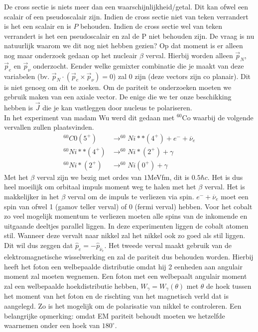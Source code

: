 \documentclass[../main.tex]{subfiles}
\begin{document}
De cross sectie is niets meer dan een waarschijnlijkheid/getal. Dit kan ofwel een scalair of een pseudoscalair zijn. Indien de cross sectie niet van teken verrandert is het een scalair en is $P$ behouden. Indien de cross sectie wel van teken verrandert is het een pseudoscalair en zal de P niet behouden zijn. De vraag is nu natuurlijk waarom we dit nog niet hebben gezien? Op dat moment is er alleen nog maar onderzoek gedaan op het nucleair $\beta$ verval. Hierbij worden alleen $\vec{p}_N$, $\vec{p}_e$ en $\vec{p}_\nu$ onderzocht. Eender welke gemixter combinatie die je maakt van deze variabelen (bv. $\vec{p}_N\cdot(\vec{p}_e\times\vec{p}_\nu)=0$) zal 0 zijn (deze vectors zijn co planair). Dit is niet genoeg om dit te zoeken. Om de pariteit te onderzoeken moeten we gebruik maken van een axiale vector. De enige die we ter onze beschikking hebben is $\vec{J}$ die je kan vastleggen door nucleus te polariseren.\\
In het experiment van madam Wu werd dit gedaan met $^{60}$Co waarbij de volgende vervallen zullen plaatsvinden.
\begin{equation}
    \begin{aligned}
        \label{eq:wu_verval}
        ^{60}C0(5^+) &\rightarrow ^{60}Ni**(4^+) + e^- + \overline \nu_e\\
        ^{60}Ni**(4^+) &\rightarrow ^{60}Ni*(2^+) + \gamma\\
        ^{60}Ni*(2^+) &\rightarrow ^{60}Ni(0^+) + \gamma
    \end{aligned}
\end{equation}
Met het $\beta$ verval zijn we bezig met ordes van $1$MeVfm, dit is $0.5\hbar c$. Het is dus heel moeilijk om orbitaal impuls moment weg te halen met het $\beta$ verval. Het is makkelijker in het $\beta$ verval om de impuls te verliezen via spin. $e^- + \overline \nu_e$ moet een spin van ofwel 1 (gamov teller verval) of 0 (fermi verval) hebben. Voor het cobalt zo veel mogelijk momentum te verliezen moeten alle spins van de inkomende en uitgaande deeltjes parallel liggen. In deze experimenten liggen de cobalt atomen stil. Wanneer deze vervalt naar nikkel zal het nikkel ook zo goed als stil liggen. Dit wil dus zeggen dat $\hat{p}_e = -\hat{p}_{\overline \nu_e}$. Het tweede verval maakt gebruik van de elektromagnetische wisselwerking en zal de pariteit dus behouden worden. Hierbij heeft het foton een welbepaalde distributie omdat hij 2 eenheden aan angulair moment zal moeten wegnemen. Een foton met een welbepaalt angulair moment zal een welbepaalde hoekdistributie hebben, $W_\gamma = W_\gamma(\theta)$ met $\theta$ de hoek tussen het moment van het foton en de rischting van het magnetisch verld dat is aangelegd. Zo is het mogelijk om de polarisatie van nikkel te controleren. Een belangrijke opmerking: omdat EM pariteit behoudt moeten we hetzelfde waarnemen onder een hoek van $180^\circ$.
\end{document}
